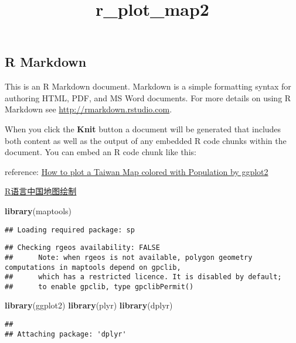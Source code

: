 \documentclass[]{article}
\title{r\_plot\_map2}
\author{}
\date{}
\newenvironment{Shaded}{\begin{snugshade}}{\end{snugshade}}
\newcommand{\KeywordTok}[1]{\textcolor[rgb]{0.13,0.29,0.53}{\textbf{#1}}}
\newcommand{\NormalTok}[1]{#1}
\begin{document}
\maketitle

\subsection{R Markdown}\label{r-markdown}

This is an R Markdown document. Markdown is a simple formatting syntax
for authoring HTML, PDF, and MS Word documents. For more details on
using R Markdown see \url{http://rmarkdown.rstudio.com}.

When you click the \textbf{Knit} button a document will be generated
that includes both content as well as the output of any embedded R code
chunks within the document. You can embed an R code chunk like this:

reference: \href{http://www.rpubs.com/OzuShi/348822}{How to plot a
Taiwan Map colored with Population by ggplot2}

\href{https://zhuanlan.zhihu.com/p/26708368}{R语言中国地图绘制}

\begin{Shaded}
\begin{Highlighting}[]
\KeywordTok{library}\NormalTok{(maptools)}
\end{Highlighting}
\end{Shaded}

\begin{verbatim}
## Loading required package: sp
\end{verbatim}

\begin{verbatim}
## Checking rgeos availability: FALSE
##      Note: when rgeos is not available, polygon geometry     computations in maptools depend on gpclib,
##      which has a restricted licence. It is disabled by default;
##      to enable gpclib, type gpclibPermit()
\end{verbatim}

\begin{Shaded}
\begin{Highlighting}[]
\KeywordTok{library}\NormalTok{(ggplot2)}
\KeywordTok{library}\NormalTok{(plyr)}
\KeywordTok{library}\NormalTok{(dplyr)}
\end{Highlighting}
\end{Shaded}

\begin{verbatim}
## 
## Attaching package: 'dplyr'
\end{verbatim}
\end{document}
